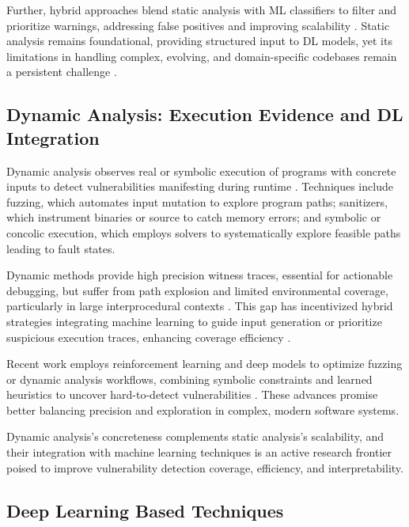 \documentclass{buthesis}
\begin{document}
Further, hybrid approaches blend static analysis with ML classifiers to filter and prioritize warnings, addressing false positives and improving scalability \cite{hu2023hybrid}. Static analysis remains foundational, providing structured input to DL models, yet its limitations in handling complex, evolving, and domain-specific codebases remain a persistent challenge \cite{Xia2023, Chakraborty2020}.

\subsection{Dynamic Analysis: Execution Evidence and DL Integration}
Dynamic analysis observes real or symbolic execution of programs with concrete inputs to detect vulnerabilities manifesting during runtime \cite{yagemann2021arcus, yagemann2021automated}. Techniques include fuzzing, which automates input mutation to explore program paths; sanitizers, which instrument binaries or source to catch memory errors; and symbolic or concolic execution, which employs solvers to systematically explore feasible paths leading to fault states.

Dynamic methods provide high precision witness traces, essential for actionable debugging, but suffer from path explosion and limited environmental coverage, particularly in large interprocedural contexts \cite{yagemann2021arcus}. This gap has incentivized hybrid strategies integrating machine learning to guide input generation or prioritize suspicious execution traces, enhancing coverage efficiency \cite{xu2023mlforfuzzing}.

Recent work employs reinforcement learning and deep models to optimize fuzzing or dynamic analysis workflows, combining symbolic constraints and learned heuristics to uncover hard-to-detect vulnerabilities \cite{tufano2022adaptive}. These advances promise better balancing precision and exploration in complex, modern software systems.

Dynamic analysis's concreteness complements static analysis’s scalability, and their integration with machine learning techniques is an active research frontier poised to improve vulnerability detection coverage, efficiency, and interpretability.



\subsection{Deep Learning Based Techniques}
\end{document}
